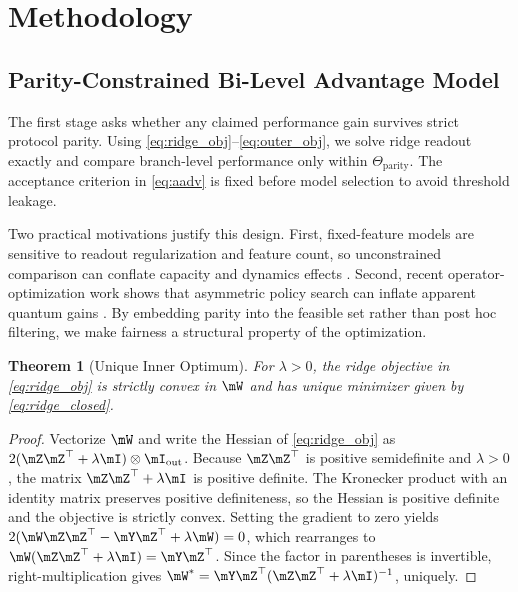 \documentclass{article} %
\newtheorem{theorem}{Theorem}[section]
\begin{document}
\section{Methodology}
\label{sec:method}
\subsection{Parity-Constrained Bi-Level Advantage Model}
The first stage asks whether any claimed performance gain survives strict protocol parity. Using \eqref{eq:ridge_obj}--\eqref{eq:outer_obj}, we solve ridge readout exactly and compare branch-level performance only within $\Theta_{\mathrm{parity}}$. The acceptance criterion in \eqref{eq:aadv} is fixed before model selection to avoid threshold leakage.

Two practical motivations justify this design. First, fixed-feature models are sensitive to readout regularization and feature count, so unconstrained comparison can conflate capacity and dynamics effects \citep{lukosevicius2009,schuld2021kernel}. Second, recent operator-optimization work shows that asymmetric policy search can inflate apparent quantum gains \citep{gross2026kernelop,aaraba2026quark}. By embedding parity into the feasible set rather than post hoc filtering, we make fairness a structural property of the optimization.

\begin{theorem}[Unique Inner Optimum]
\label{thm:inner_unique}
For $\lambda>0$, the ridge objective in \eqref{eq:ridge_obj} is strictly convex in $\mW$ and has unique minimizer given by \eqref{eq:ridge_closed}.
\end{theorem}
\begin{proof}
Vectorize $\mW$ and write the Hessian of \eqref{eq:ridge_obj} as
$2(\mZ\mZ^{\top}+\lambda\mI)\otimes\mI_{\mathrm{out}}$.
Because $\mZ\mZ^{\top}$ is positive semidefinite and $\lambda>0$, the matrix
$\mZ\mZ^{\top}+\lambda\mI$ is positive definite.
The Kronecker product with an identity matrix preserves positive definiteness, so the Hessian is positive definite and the objective is strictly convex.
Setting the gradient to zero yields
$2(\mW\mZ\mZ^{\top}-\mY\mZ^{\top}+\lambda\mW)=0$,
which rearranges to
$\mW(\mZ\mZ^{\top}+\lambda\mI)=\mY\mZ^{\top}$.
Since the factor in parentheses is invertible, right-multiplication gives
$\mW^*=\mY\mZ^{\top}(\mZ\mZ^{\top}+\lambda\mI)^{-1}$, uniquely.
\end{proof}
\end{document}
